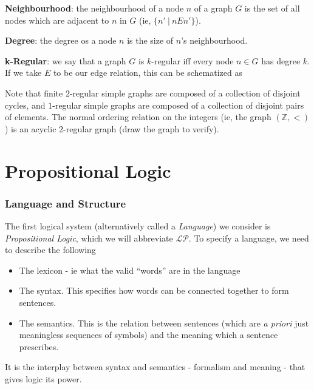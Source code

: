 \documentclass[12pt]{article}
\begin{document}
\textbf{Neighbourhood}: the neighbourhood of a node $n$ of a graph $G$ is the set of all nodes which are adjacent to $n$ in $G$ (ie, $\{n'\ |\ nEn' \}$).

\textbf{Degree}: the degree os a node $n$ is the size of $n$'s neighbourhood. 

\textbf{k-Regular}: we say that a graph $G$ is $k$-regular iff every node $n \in G$ has degree $k$. If we take $E$ to be our edge relation, this can be schematized as 

Note that finite $2$-regular simple graphs are composed of a collection of disjoint cycles, and $1$-regular simple graphs are composed of a collection of disjoint pairs of elements. The normal ordering relation on the integers (ie, the graph $(\mathbb{Z}, <)$) is an acyclic 2-regular graph (draw the graph to verify). 

\newpage
\part{Propositional Logic}
\section{Language and Structure}

The first logical system (alternatively called a \emph{Language}) we consider is \emph{Propositional Logic}, which we will abbreviate $\mathcal{LP}$. To specify a language, we need to describe the following
\begin{itemize}
  \item The lexicon - ie what the valid ``words'' are in the language
  \item The syntax. This specifies how words can be connected together to form sentences. 
  \item The semantics. This is the relation between sentences (which are \emph{a priori} just meaningless sequences of symbols) and the meaning which a sentence prescribes. 
\end{itemize}
It is the interplay between syntax and semantics - formalism and meaning - that gives logic its power. 
\end{document}
